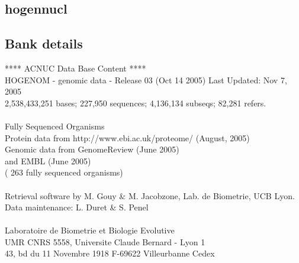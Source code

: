 \documentclass{article}
\begin{document}
\begin{Schunk}
\section{ hogennucl }
\subsection{Bank details}
               ****     ACNUC Data Base Content      ****                      \\
  HOGENOM - genomic data - Release 03 (Oct 14 2005) Last Updated: Nov  7, 2005\\
2,538,433,251 bases; 227,950 sequences; 4,136,134 subseqs; 82,281 refers.\\
                                                                               \\
                        Fully Sequenced Organisms\\
   Protein data from http://www.ebi.ac.uk/proteome/ (August, 2005)\\
          Genomic data from GenomeReview  (June 2005) \\
                  and  EMBL (June 2005)\\
	   ( 263 fully sequenced organisms)\\
\\
Retrieval software by M. Gouy \& M. Jacobzone, Lab. de Biometrie, UCB Lyon.\\
Data maintenance: L. Duret \& S. Penel\\
\\
Laboratoire de Biometrie et Biologie Evolutive\\
UMR CNRS 5558, Universite Claude Bernard - Lyon 1 \\
43, bd du 11 Novembre 1918 F-69622 Villeurbanne Cedex\\



\end{Schunk}
\end{document}
